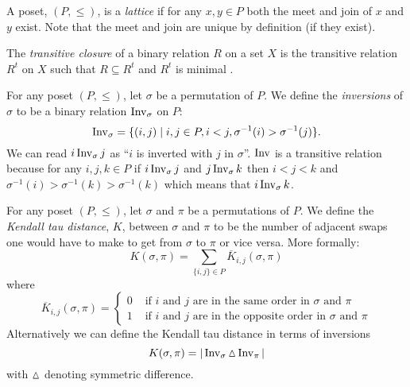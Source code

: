 	\begin{definition}
		\label{lattice-definition}
		A poset, $(P, \le)$, is a \emph{lattice} if for any $x, y \in P$ both the meet and join of $x$ and $y$ exist. Note that the meet and join are unique by definition (if they exist).
	\end{definition}

	\begin{definition}
		\label{transitive-closure-definition}
		The \emph{transitive closure} of a binary relation $R$ on a set $X$ is the transitive relation $R^t$ on $X$ such that $R \subseteq R^t$ and $R^t$ is minimal \cite[p. 337]{lidl1998applied}.
	\end{definition}

	\begin{definition}
		\label{inversion-definition}
		For any poset $(P, \le)$, let $\sigma$ be a permutation of $P$. We define the \emph{inversions} of $\sigma$ to be a binary relation $\operatorname{Inv}_{\sigma}$ on $P$:
		\[
			\operatorname{Inv}_{\sigma} = \{(i,j) \mid i, j \in P, i < j, \sigma^{-1}(i) > \sigma^{-1}(j)\}.
		\]
		We can read $i \operatorname{Inv}_{\sigma} j$ as ``$i$ is inverted with $j$ in $\sigma$''. $\operatorname{Inv}$ is a transitive relation because for any $i,j,k \in P$ if $i \operatorname{Inv}_{\sigma} j$ and $j \operatorname{Inv}_{\sigma} k$ then $i < j < k$ and $\sigma^{-1}(i) > \sigma^{-1}(k) > \sigma^{-1}(k)$ which means that $i \operatorname{Inv}_{\sigma} k$.
	\end{definition}

	\begin{definition}
		\label{kendall-tau-definition}
		For any poset $(P, \le)$, let $\sigma$ and $\pi$ be a permutations of $P$. We define the \emph{Kendall tau distance}, $K$, between $\sigma$ and $\pi$ to be the number of adjacent swaps one would have to make to get from $\sigma$ to $\pi$ or vice versa. More formally:
		\[
			K(\sigma, \pi) = \sum_{\{i, j\} \in P} \overline{K}_{i, j}(\sigma, \pi)
		\]
		where
		\[
			\overline{K}_{i,j}(\sigma, \pi) =
				\begin{cases}
					0 & \textrm{ if } i \textrm{ and } j \textrm{ are in the same order in } \sigma \textrm{ and } \pi \\
					1 & \textrm{ if } i \textrm{ and } j \textrm{ are in the opposite order in } \sigma \textrm{ and } \pi
				\end{cases}
		\]
		Alternatively we can define the Kendall tau distance in terms of inversions
		\[
			K(\sigma, \pi) = |\operatorname{Inv}_{\sigma} \operatorname{\vartriangle} \operatorname{Inv}_{\pi}|
		\]
		with $\operatorname{\vartriangle}$ denoting symmetric difference.
	\end{definition}

